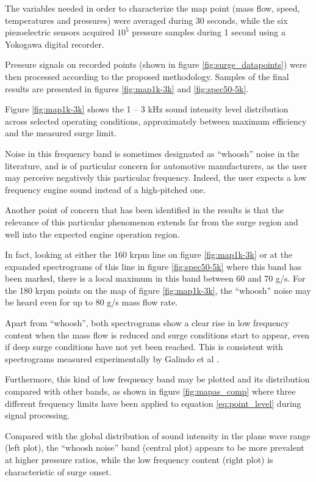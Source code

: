 The variables needed in order to characterize the map point (mass flow, speed, temperatures and pressures) were averaged during 30 seconds, while the six piezoelectric sensors acquired $10^5$ pressure samples during 1 second using a Yokogawa digital recorder.

Pressure signals on recorded points (shown in figure \ref{fig:surge_datapoints}) were then processed according to the proposed methodology. Samples of the final results are presented in figures \ref{fig:map1k-3k} and \ref{fig:spec50-5k}.

Figure \ref{fig:map1k-3k} shows the 1 -- 3 kHz sound intensity level distribution across selected operating conditions, approximately between maximum efficiency and the measured surge limit.

Noise in this frequency band is sometimes designated as ``whoosh'' noise in the literature, and is of particular concern for automotive manufacturers, as the user may perceive negatively this particular frequency. Indeed, the  user expects a low frequency engine sound instead of a high-pitched one.

Another point of concern that has been identified in the results is that the relevance of this particular phenomenon extends far from the surge region and well into the expected engine operation region.

In fact, looking at either the 160 krpm line on figure \ref{fig:map1k-3k} or at the expanded spectrograms of this line in figure \ref{fig:spec50-5k} where this band has been marked, there is a local maximum in this band between 60 and 70 g/s. For the 180 krpm points on the map of figure \ref{fig:map1k-3k}, the ``whoosh'' noise may be heard even for up to 80 g/s mass flow rate.

Apart from ``whoosh'', both spectrograms show a clear rise in low frequency content when the mass flow is reduced and surge conditions start to appear, even if deep surge conditions have not yet been reached. This is consistent with spectrograms measured experimentally by Galindo et al \cite{galindo2009effect}.

Furthermore, this kind of low frequency band may be plotted and its distribution compared with other bands, as shown in figure \ref{fig:mapas_comp} where three different frequency limits have been applied to equation \ref{eq:point_level} during signal processing.

Compared with the global distribution of sound intensity in the plane wave range (left plot), the ``whoosh noise'' band (central plot) appears to be more prevalent at higher pressure ratios, while the low frequency content (right plot) is characteristic of surge onset.

